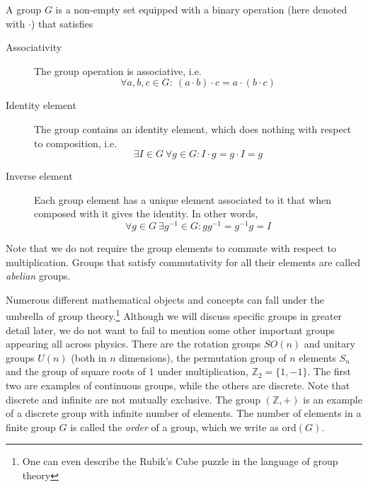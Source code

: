\begin{defn}[Group]\label{defn:group}
  A group $G$ is a non-empty set equipped with a binary operation (here denoted
  with $\cdot$) that satisfies
  \begin{description}
    \item[Associativity] The group operation is associative, i.e.
      $$\forall a,b,c \in G:\ (a\cdot b) \cdot c = a \cdot
      (b \cdot c)$$
    \item[Identity element] The group contains an identity element, which does
      nothing with respect to composition, i.e.
      $$\exists I\in G \ \forall g \in G : I\cdot g = g \cdot I = g$$
    \item[Inverse element] Each group element has a unique element associated
      to it that when composed with it gives the identity. In other words,
      $$\forall g \in G \ \exists g^{-1} \in G : g g^{-1} = g^{-1} g = I $$
  \end{description}
\end{defn}

Note that we do not require the group elements to commute with respect to
multiplication. Groups that satisfy commutativity for all their elements are
called \emph{abelian} groups.

Numerous different mathematical objects and concepts can fall under the
umbrella of group theory.\footnote{One can even describe the Rubik's Cube
puzzle in the language of group theory} Although we will discuss specific
groups in greater detail later, we do not want to fail to mention some other
important groups appearing all across physics. There are the rotation groups
$SO(n)$ and unitary groups $U(n)$ (both in $n$ dimensions), the permutation
group of $n$ elements $S_n$ and the group of square roots of $1$ under
multiplication, $\mathbb{Z}_2 = \{1, -1\}$.  The first two are examples of
continuous groups, while the others are discrete. Note that discrete and
infinite are not mutually exclusive. The group $(\mathbb{Z}, +)$ is an example
of a discrete group with infinite number of elements.
The number of elements in a finite group $G$ is
called the \emph{order} of a group, which we write as $\mathrm{ord}(G)$.

